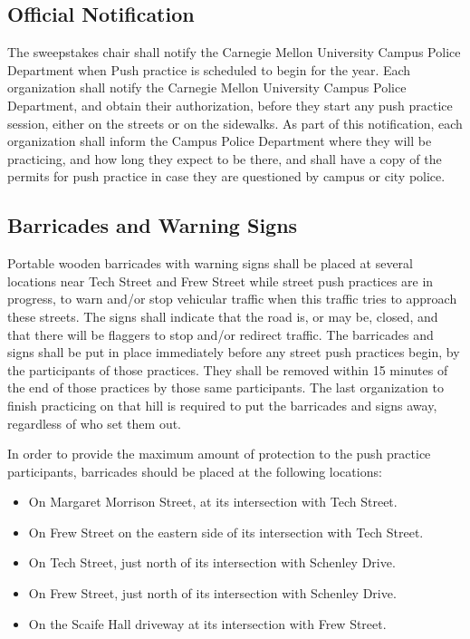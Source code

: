 \subsection{Official Notification}

	The sweepstakes chair shall notify the Carnegie Mellon University Campus Police
	Department when Push practice is scheduled to begin for the year. Each
	organization shall notify the Carnegie Mellon University Campus Police
	Department, and obtain their authorization, before they start any push practice
	session, either on the streets or on the sidewalks. As part of this
	notification, each organization shall inform the Campus Police Department where
	they will be practicing, and how long they expect to be there, and shall have a
	copy of the permits for push practice in case they are questioned by campus or
	city police.

\subsection{Barricades and Warning Signs}

	Portable wooden barricades with warning signs shall be placed at several
	locations near Tech Street and Frew Street while street push practices are in
	progress, to warn and/or stop vehicular traffic when this traffic tries to
	approach these streets. The signs shall indicate that the road is, or may be,
	closed, and that there will be flaggers to stop and/or redirect traffic. The
	barricades and signs shall be put in place immediately before any street push
	practices begin, by the participants of those practices. They shall be removed
	within 15 minutes of the end of those practices by those same participants.
	The last organization to finish practicing on that hill is required to put
	the barricades and signs away, regardless of who set them out.

	In order to provide the maximum amount of protection to the push practice
	participants, barricades should be placed at the following locations:

	\begin{itemize}

		\item On Margaret Morrison Street, at its intersection with Tech Street.

		\item On Frew Street on the eastern side of its intersection with Tech
		Street.

		\item On Tech Street, just north of its intersection with Schenley Drive.

		\item On Frew Street, just north of its intersection with Schenley Drive.

		\item On the Scaife Hall driveway at its intersection with Frew Street.

	\end{itemize}

